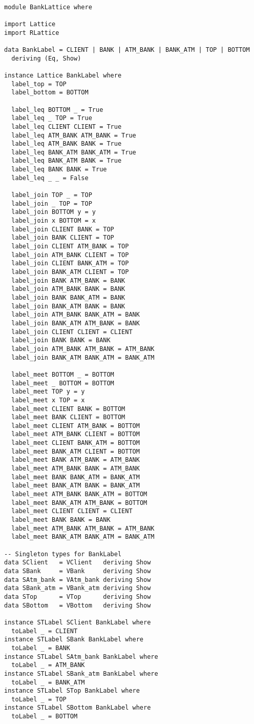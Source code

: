 \begin{Verbatim}[fontsize=\footnotesize,frame=lines,
                 framesep=5mm, label={[BankLattice.hs]BankLattice.hs}]

module BankLattice where

import Lattice
import RLattice

data BankLabel = CLIENT | BANK | ATM_BANK | BANK_ATM | TOP | BOTTOM
  deriving (Eq, Show)

instance Lattice BankLabel where
  label_top = TOP
  label_bottom = BOTTOM

  label_leq BOTTOM _ = True
  label_leq _ TOP = True
  label_leq CLIENT CLIENT = True
  label_leq ATM_BANK ATM_BANK = True
  label_leq ATM_BANK BANK = True
  label_leq BANK_ATM BANK_ATM = True
  label_leq BANK_ATM BANK = True
  label_leq BANK BANK = True
  label_leq _ _ = False

  label_join TOP _ = TOP
  label_join _ TOP = TOP
  label_join BOTTOM y = y
  label_join x BOTTOM = x
  label_join CLIENT BANK = TOP
  label_join BANK CLIENT = TOP
  label_join CLIENT ATM_BANK = TOP
  label_join ATM_BANK CLIENT = TOP
  label_join CLIENT BANK_ATM = TOP
  label_join BANK_ATM CLIENT = TOP
  label_join BANK ATM_BANK = BANK
  label_join ATM_BANK BANK = BANK
  label_join BANK BANK_ATM = BANK
  label_join BANK_ATM BANK = BANK
  label_join ATM_BANK BANK_ATM = BANK
  label_join BANK_ATM ATM_BANK = BANK
  label_join CLIENT CLIENT = CLIENT
  label_join BANK BANK = BANK
  label_join ATM_BANK ATM_BANK = ATM_BANK
  label_join BANK_ATM BANK_ATM = BANK_ATM

  label_meet BOTTOM _ = BOTTOM
  label_meet _ BOTTOM = BOTTOM
  label_meet TOP y = y
  label_meet x TOP = x
  label_meet CLIENT BANK = BOTTOM
  label_meet BANK CLIENT = BOTTOM
  label_meet CLIENT ATM_BANK = BOTTOM
  label_meet ATM_BANK CLIENT = BOTTOM
  label_meet CLIENT BANK_ATM = BOTTOM
  label_meet BANK_ATM CLIENT = BOTTOM
  label_meet BANK ATM_BANK = ATM_BANK
  label_meet ATM_BANK BANK = ATM_BANK
  label_meet BANK BANK_ATM = BANK_ATM
  label_meet BANK_ATM BANK = BANK_ATM
  label_meet ATM_BANK BANK_ATM = BOTTOM
  label_meet BANK_ATM ATM_BANK = BOTTOM
  label_meet CLIENT CLIENT = CLIENT
  label_meet BANK BANK = BANK
  label_meet ATM_BANK ATM_BANK = ATM_BANK
  label_meet BANK_ATM BANK_ATM = BANK_ATM

-- Singleton types for BankLabel
data SClient   = VClient   deriving Show
data SBank     = VBank     deriving Show
data SAtm_bank = VAtm_bank deriving Show
data SBank_atm = VBank_atm deriving Show
data STop      = VTop      deriving Show
data SBottom   = VBottom   deriving Show

instance STLabel SClient BankLabel where
  toLabel _ = CLIENT
instance STLabel SBank BankLabel where
  toLabel _ = BANK
instance STLabel SAtm_bank BankLabel where
  toLabel _ = ATM_BANK
instance STLabel SBank_atm BankLabel where
  toLabel _ = BANK_ATM
instance STLabel STop BankLabel where
  toLabel _ = TOP
instance STLabel SBottom BankLabel where
  toLabel _ = BOTTOM
\end{Verbatim}
